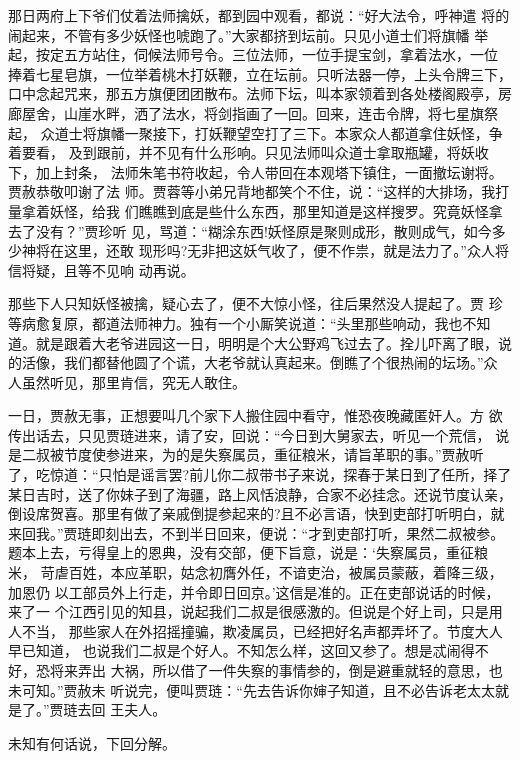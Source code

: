 那日两府上下爷们仗着法师擒妖，都到园中观看，都说：“好大法令，呼神遣
将的闹起来，不管有多少妖怪也唬跑了。”大家都挤到坛前。只见小道士们将旗幡
举起，按定五方站住，伺候法师号令。三位法师，一位手提宝剑，拿着法水，一位
捧着七星皂旗，一位举着桃木打妖鞭，立在坛前。只听法器一停，上头令牌三下，
口中念起咒来，那五方旗便团团散布。法师下坛，叫本家领着到各处楼阁殿亭，房
廊屋舍，山崖水畔，洒了法水，将剑指画了一回。回来，连击令牌，将七星旗祭起，
众道士将旗幡一聚接下，打妖鞭望空打了三下。本家众人都道拿住妖怪，争着要看，
及到跟前，并不见有什么形响。只见法师叫众道士拿取瓶罐，将妖收下，加上封条，
法师朱笔书符收起，令人带回在本观塔下镇住，一面撤坛谢将。贾赦恭敬叩谢了法
师。贾蓉等小弟兄背地都笑个不住，说：“这样的大排场，我打量拿着妖怪，给我
们瞧瞧到底是些什么东西，那里知道是这样搜罗。究竟妖怪拿去了没有？”贾珍听
见，骂道：“糊涂东西!妖怪原是聚则成形，散则成气，如今多少神将在这里，还敢
现形吗?无非把这妖气收了，便不作祟，就是法力了。”众人将信将疑，且等不见响
动再说。

那些下人只知妖怪被擒，疑心去了，便不大惊小怪，往后果然没人提起了。贾
珍等病愈复原，都道法师神力。独有一个小厮笑说道：“头里那些响动，我也不知
道。就是跟着大老爷进园这一日，明明是个大公野鸡飞过去了。拴儿吓离了眼，说
的活像，我们都替他圆了个谎，大老爷就认真起来。倒瞧了个很热闹的坛场。”众
人虽然听见，那里肯信，究无人敢住。

一日，贾赦无事，正想要叫几个家下人搬住园中看守，惟恐夜晚藏匿奸人。方
欲传出话去，只见贾琏进来，请了安，回说：“今日到大舅家去，听见一个荒信，
说是二叔被节度使参进来，为的是失察属员，重征粮米，请旨革职的事。”贾赦听
了，吃惊道：“只怕是谣言罢?前儿你二叔带书子来说，探春于某日到了任所，择了
某日吉时，送了你妹子到了海疆，路上风恬浪静，合家不必挂念。还说节度认亲，
倒设席贺喜。那里有做了亲戚倒提参起来的?且不必言语，快到吏部打听明白，就
来回我。”贾琏即刻出去，不到半日回来，便说：“才到吏部打听，果然二叔被参。
题本上去，亏得皇上的恩典，没有交部，便下旨意，说是：‘失察属员，重征粮米，
苛虐百姓，本应革职，姑念初膺外任，不谙吏治，被属员蒙蔽，着降三级，加恩仍
以工部员外上行走，并令即日回京。’这信是准的。正在吏部说话的时候，来了一
个江西引见的知县，说起我们二叔是很感激的。但说是个好上司，只是用人不当，
那些家人在外招摇撞骗，欺凌属员，已经把好名声都弄坏了。节度大人早已知道，
也说我们二叔是个好人。不知怎么样，这回又参了。想是忒闹得不好，恐将来弄出
大祸，所以借了一件失察的事情参的，倒是避重就轻的意思，也未可知。”贾赦未
听说完，便叫贾琏：“先去告诉你婶子知道，且不必告诉老太太就是了。”贾琏去回
王夫人。

未知有何话说，下回分解。